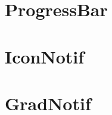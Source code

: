 

\chapter{ProgressBar}
\label{ch:Progressbar}

\chapter{IconNotif}
\label{ch:Iconnotif}

\chapter{GradNotif}
\label{ch:Gradnotif}